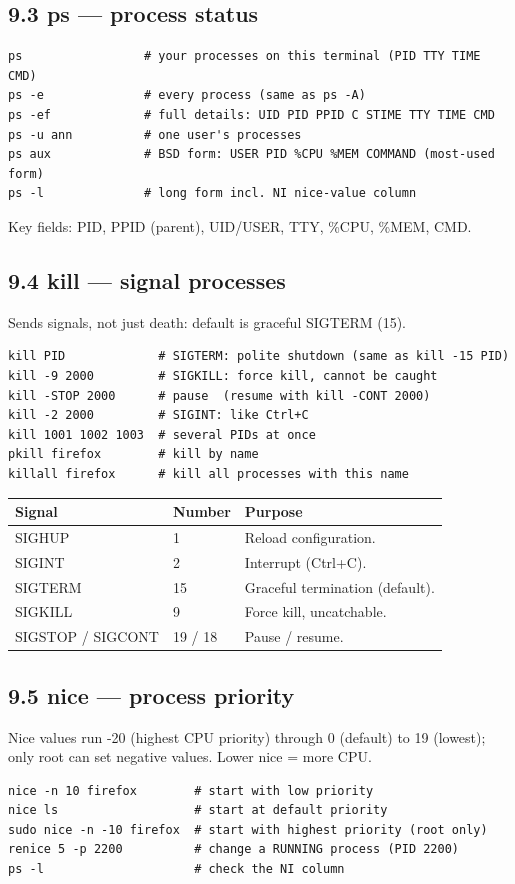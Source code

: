 \documentclass[11pt,a4paper]{article}
\begin{document}
\subsection{9.3 ps --- process status}
\begin{lstlisting}
ps                 # your processes on this terminal (PID TTY TIME CMD)
ps -e              # every process (same as ps -A)
ps -ef             # full details: UID PID PPID C STIME TTY TIME CMD
ps -u ann          # one user's processes
ps aux             # BSD form: USER PID %CPU %MEM COMMAND (most-used form)
ps -l              # long form incl. NI nice-value column
\end{lstlisting}
Key fields: PID, PPID (parent), UID/USER, TTY, \%CPU, \%MEM, CMD.

\subsection{9.4 kill --- signal processes}
Sends signals, not just death: default is graceful SIGTERM (15).
\begin{lstlisting}
kill PID             # SIGTERM: polite shutdown (same as kill -15 PID)
kill -9 2000         # SIGKILL: force kill, cannot be caught
kill -STOP 2000      # pause  (resume with kill -CONT 2000)
kill -2 2000         # SIGINT: like Ctrl+C
kill 1001 1002 1003  # several PIDs at once
pkill firefox        # kill by name
killall firefox      # kill all processes with this name
\end{lstlisting}
\begin{center}
\small
\begin{tabularx}{\textwidth}{lll}
\toprule
Signal & Number & Purpose \\
\midrule
SIGHUP & 1 & Reload configuration. \\
SIGINT & 2 & Interrupt (Ctrl+C). \\
SIGTERM & 15 & Graceful termination (default). \\
SIGKILL & 9 & Force kill, uncatchable. \\
SIGSTOP / SIGCONT & 19 / 18 & Pause / resume. \\
\bottomrule
\end{tabularx}
\end{center}

\subsection{9.5 nice --- process priority}
Nice values run -20 (highest CPU priority) through 0 (default) to 19 (lowest); only root can set negative values. Lower nice = more CPU.
\begin{lstlisting}
nice -n 10 firefox        # start with low priority
nice ls                   # start at default priority
sudo nice -n -10 firefox  # start with highest priority (root only)
renice 5 -p 2200          # change a RUNNING process (PID 2200)
ps -l                     # check the NI column
\end{lstlisting}
\end{document}
